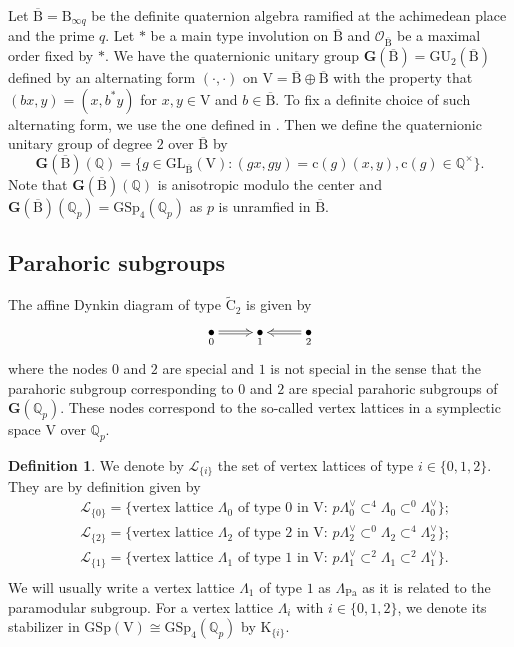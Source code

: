 \documentclass[10pt]{amsart}
\numberwithin{equation}{section}
\theoremstyle{definition}
\newtheorem{definition}[equation]{Definition}
\def\GL{\mathrm{GL}}
\def\GSp{\mathrm{GSp}}
\def\Pa{\mathrm{Pa}}
\def\calL{\mathcal{L}}
\def\calO{\mathcal{O}}
\def\bfG{\mathbf{G}}
\def\QQ{\mathbb{Q}}
\def\rmc{\mathrm{c}}
\def\rmB{\mathrm{B}}
\def\rmC{\mathrm{C}}
\def\rmK{\mathrm{K}}
\def\rmV{\mathrm{V}}
\begin{document}
Let $\overline{\rmB}=\rmB_{\infty q}$ be the definite quaternion algebra ramified at the achimedean place and the prime $q$.  Let $\ast$ be a {main type involution} on $\overline{\rmB}$ and $\calO_{\overline{\rmB}}$ be a maximal order fixed by $\ast$. We have the quaternionic unitary group $\bfG(\overline{\rmB})=\mathrm{GU}_{2}(\overline{\rmB})$ defined by an alternating form $(\cdot, \cdot)$ on $\rmV=\overline{\rmB}\oplus \overline{\rmB}$ with the property that $(bx, y)=(x, b^{\ast}y)$ for $x, y\in \rmV$ and $b\in \overline{\rmB}$. To fix a definite choice of such alternating form, we use the one defined in \cite[\S 7.1]{Oki}. Then we define the quaternionic unitary group of degree $2$ over $\overline{\rmB}$ by
\begin{equation*}
\bfG(\overline{\rmB})(\QQ)=\{g\in \GL_{\overline{\rmB}}(\rmV): (gx, gy)=\rmc(g)(x, y), \rmc(g)\in \QQ^{\times}\}. 
\end{equation*}
Note that $\bfG(\overline{\rmB})(\QQ)$ is anisotropic modulo the center and $\bfG(\overline{\rmB})(\QQ_{p})=\GSp_{4}(\QQ_{p})$ as $p$ is unramfied in $\overline{\rmB}$.

\subsection{Parahoric subgroups}
The affine Dynkin diagram of type $\widetilde{\rmC}_{2}$ is given by
\begin{displaymath}
  \xymatrix{\underset{0}\bullet \ar@2{->}[r] &\underset{1}\bullet &\underset{2}\bullet \ar@2{->}[l]}
\end{displaymath}
where the nodes $0$ and $2$ are special and $1$ is not special in the sense that the parahoric subgroup corresponding to $0$ and $2$ are special parahoric subgroups of $\bfG(\QQ_{p})$. These nodes correspond to the so-called vertex lattices in a symplectic space $\rmV$ over $\QQ_{p}$. 

\begin{definition}
We denote by $\calL_{\{i\}}$ the set of vertex lattices of type $i\in\{0, 1, 2\}$. They are by definition given by
\begin{equation*}\label{vertex-lattice}
\begin{split}
&\calL_{\{0\}}=\{\text{vertex lattice $\Lambda_{0}$ of type $0$ in $\rmV$: } p\Lambda^{\vee}_{0}\subset^{4} \Lambda_{0}\subset^{0} \Lambda^{\vee}_{0}\};\\
&\calL_{\{2\}}=\{\text{vertex lattice $\Lambda_{2}$ of type $2$ in $\rmV$: }  p\Lambda^{\vee}_{2}\subset^{0} \Lambda_{2}\subset^{4} \Lambda^{\vee}_{2}\};\\
&\calL_{\{1\}}=\{\text{vertex lattice $\Lambda_{1}$ of type $1$ in $\rmV$: }  p\Lambda^{\vee}_{1}\subset^{2} \Lambda_{1}\subset^{2} \Lambda^{\vee}_{1}\}.\\
\end{split}
\end{equation*}
We will usually write a vertex lattice $\Lambda_{1}$ of type $1$ as $\Lambda_{\Pa}$ as it is related to the paramodular subgroup. For a vertex lattice $\Lambda_{i}$ with $i\in\{0,1,2\}$, we denote its stabilizer in $\GSp(\rmV)\cong\GSp_{4}(\QQ_{p})$ by $\rmK_{\{i\}}$. 
\end{definition}
\end{document}
